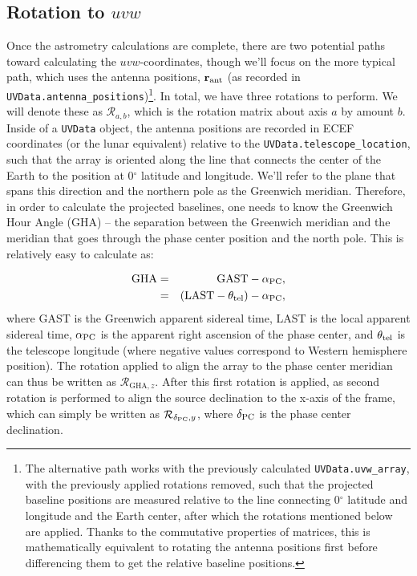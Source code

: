 \documentclass[11pt, oneside]{article}
\begin{document}
\subsection{Rotation to $uvw$}\label{ssec:rotation}
Once the astrometry calculations are complete, there are two potential paths toward calculating the $uvw$-coordinates, though we'll focus on the more typical path, which uses the antenna positions, $\mathbf{r}_{\rm ant}$ (as recorded in \texttt{UVData.antenna\_positions})\footnote{The alternative path works with the previously calculated \texttt{UVData.uvw\_array}, with the previously applied rotations removed, such that the projected baseline positions are measured relative to the line connecting 0$^\circ$ latitude and longitude and the Earth center, after which the rotations mentioned below are applied. Thanks to the commutative properties of matrices, this is mathematically equivalent to rotating the antenna positions first before differencing them to get the relative baseline positions.}. In total, we have three rotations to perform. We will denote these as $\mathcal{R}_{a,b}$, which is the rotation matrix about axis $a$ by amount $b$. Inside of a \texttt{UVData} object, the antenna positions are recorded in ECEF coordinates (or the lunar equivalent) relative to the \texttt{UVData.telescope\_location}, such that the array is oriented along the line that connects the center of the Earth to the position at 0$^\circ$ latitude and longitude. We'll refer to the plane that spans this direction and the northern pole as the Greenwich meridian. Therefore, in order to calculate the projected baselines, one needs to know the Greenwich Hour Angle (GHA) -- the separation between the Greenwich meridian and the meridian that goes through the phase center position and the north pole. This is relatively easy to calculate as:

\begin{eqnarray}
{\rm GHA} &=& {\rm GAST} - \alpha_{\rm PC}, \\
          &=& ({\rm LAST} - \theta_{\rm tel}) - \alpha_{\rm PC},
\end{eqnarray}
where GAST is the Greenwich apparent sidereal time, LAST is the local apparent sidereal time, $\alpha_{\rm PC}$ is the apparent right ascension of the phase center, and $\theta_{\rm tel}$ is the telescope longitude (where negative values correspond to Western hemisphere position). The rotation applied to align the array to the phase center meridian can thus be written as $\mathcal{R}_{\textrm{GHA}, z}$. After this first rotation is applied, as second rotation is performed to align the source declination to the x-axis of the frame, which can simply be written as $\mathcal{R}_{\delta_{\rm PC}, y}$, where $\delta_{\rm PC}$ is the phase center declination.
\end{document}
